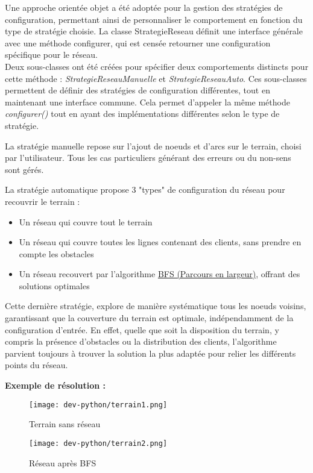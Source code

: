 Une approche orientée objet a été adoptée pour la gestion des stratégies de configuration, permettant ainsi de personnaliser le comportement en fonction du type de stratégie choisie. La classe StrategieReseau définit une interface générale avec une méthode configurer, qui est censée retourner une configuration spécifique pour le réseau.
\\
Deux sous-classes ont été créées pour spécifier deux comportements distincts pour cette méthode : \textit{StrategieReseauManuelle} et \textit{StrategieReseauAuto}. Ces sous-classes permettent de définir des stratégies de configuration différentes, tout en maintenant une interface commune. Cela permet d’appeler la même méthode \textit{configurer()} tout en ayant des implémentations différentes selon le type de stratégie.
\vspace{0.2cm}

La stratégie manuelle repose sur l'ajout de noeuds et d'arcs sur le terrain, choisi par l'utilisateur. Tous les cas particuliers générant des erreurs ou du non-sens sont gérés.

La stratégie automatique propose 3 "types" de configuration du réseau pour recouvrir le terrain :

\begin{itemize}
\item Un réseau qui couvre tout le terrain
\item Un réseau qui couvre toutes les lignes contenant des clients, sans prendre en compte les obstacles
\item Un réseau recouvert par l'algorithme \href{https://fr.wikipedia.org/wiki/Algorithme_de_parcours_en_largeur}{BFS (Parcours en largeur)}, offrant des solutions optimales
\end{itemize}

Cette dernière stratégie, explore de manière systématique tous les noeuds voisins, garantissant que la couverture du terrain est optimale, indépendamment de la configuration d'entrée. En effet, quelle que soit la disposition du terrain, y compris la présence d'obstacles ou la distribution des clients, l'algorithme parvient toujours à trouver la solution la plus adaptée pour relier les différents points du réseau.

\vspace{0.2cm}
\textbf{Exemple de résolution :}

\begin{figure}[h!]
    \centering
    \begin{minipage}{0.48\textwidth}
        \centering
        \texttt{[image: dev-python/terrain1.png]}
        \caption{Terrain sans réseau}
        \label{fig:image1}
    \end{minipage} \hfill
    \begin{minipage}{0.48\textwidth}
        \centering
        \texttt{[image: dev-python/terrain2.png]}
        \caption{Réseau après BFS}
        \label{fig:image2}
    \end{minipage}
\end{figure}

